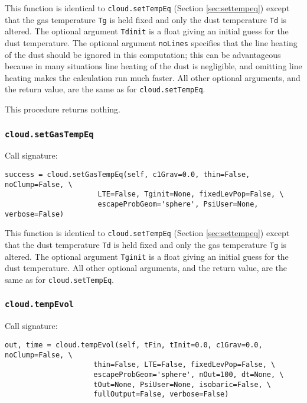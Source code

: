 \documentclass[12pt]{article}
\begin{document}
This function is identical to \verb=cloud.setTempEq= (Section \ref{sec:settempeq}) except that the gas temperature \verb=Tg= is held fixed and only the dust temperature \verb=Td= is altered. The optional argument \verb=Tdinit= is a float giving an initial guess for the dust temperature. The optional argument \verb=noLines= specifies that the line heating of the dust should be ignored in this computation; this can be advantageous because in many situations line heating of the dust is negligible, and omitting line heating makes the calculation run much faster. All other optional arguments, and the return value, are the same as for \verb=cloud.setTempEq=.

This procedure returns nothing.

\subsubsection{\texttt{cloud.setGasTempEq}}

Call signature:

\begin{verbatim}
success = cloud.setGasTempEq(self, c1Grav=0.0, thin=False, noClump=False, \
                      LTE=False, Tginit=None, fixedLevPop=False, \
                      escapeProbGeom='sphere', PsiUser=None, verbose=False)
\end{verbatim}

This function is identical to \verb=cloud.setTempEq= (Section \ref{sec:settempeq}) except that the dust temperature \verb=Td= is held fixed and only the gas temperature \verb=Tg= is altered. The optional argument \verb=Tginit= is a float giving an initial guess for the dust temperature. All other optional arguments, and the return value, are the same as for \verb=cloud.setTempEq=.

\subsubsection{\texttt{cloud.tempEvol}}
\label{sec:tempevol}

Call signature:

\begin{verbatim}
out, time = cloud.tempEvol(self, tFin, tInit=0.0, c1Grav=0.0, noClump=False, \
                     thin=False, LTE=False, fixedLevPop=False, \
                     escapeProbGeom='sphere', nOut=100, dt=None, \
                     tOut=None, PsiUser=None, isobaric=False, \
                     fullOutput=False, verbose=False)
\end{verbatim}
\end{document}
